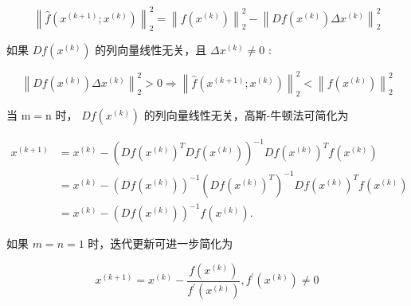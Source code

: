 \begin{equation} \left\|\hat{f}\left(x^{(k+1)} ; x^{(k)}\right)\right\|_{2}^{2}=\left\|f\left(x^{(k)}\right)\right\|_{2}^{2}-\left\|D f\left(x^{(k)}\right) \Delta x^{(k)}\right\|_{2}^{2} \end{equation}

如果 $ D f\left(x^{(k)}\right) $ 的列向量线性无关，且 $ \Delta x^{(k)} \neq 0 $ :

\begin{equation} \left\|D f\left(x^{(k)}\right) \Delta x^{(k)}\right\|_{2}^{2}>0 \Rightarrow\left\|\hat{f}\left(x^{(k+1)} ; x^{(k)}\right)\right\|_{2}^{2}<\left\|f\left(x^{(k)}\right)\right\|_{2}^{2} \end{equation}

当 $ \mathrm{m}=\mathrm{n} $ 时， $ D f\left(x^{(k)}\right) $ 的列向量线性无关，高斯-牛顿法可简化为

\begin{equation}
\begin{aligned}
x^{(k+1)} &=x^{(k)}-\left(D f\left(x^{(k)}\right)^{T} D f\left(x^{(k)}\right)\right)^{-1} D f\left(x^{(k)}\right)^{T} f\left(x^{(k)}\right) \\
&=x^{(k)}-\left(D f\left(x^{(k)}\right)\right)^{-1}\left(D f\left(x^{(k)}\right)^{T}\right)^{-1} D f\left(x^{(k)}\right)^{T} f\left(x^{(k)}\right) \\
&=x^{(k)}-\left(D f\left(x^{(k)}\right)\right)^{-1} f\left(x^{(k)}\right) .
\end{aligned}
\end{equation}


如果 $ m=n=1 $ 时，迭代更新可进一步简化为

\begin{equation} x^{(k+1)}=x^{(k)}-\frac{f\left(x^{(k)}\right)}{f^{\prime}\left(x^{(k)}\right)}, f^{\prime}\left(x^{(k)}\right) \neq 0 \end{equation}

